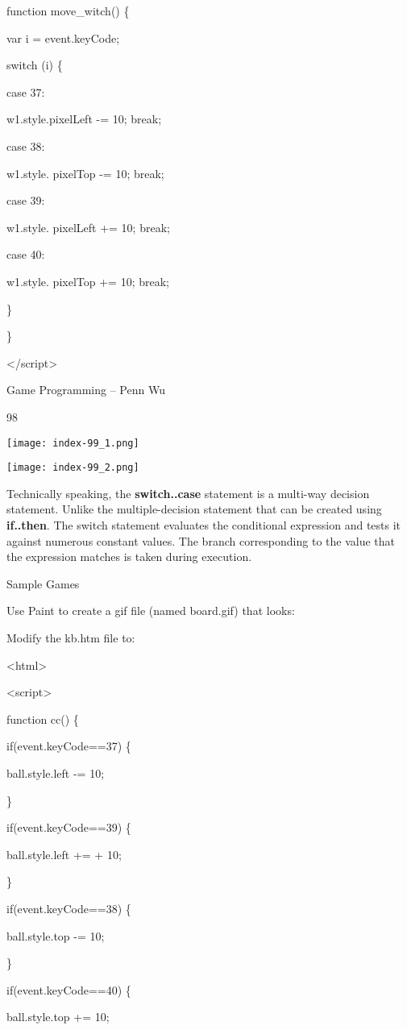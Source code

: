 \documentclass[
]{article}
\begin{document}
function move\_witch() \{

var i = event.keyCode;

switch (i) \{

case 37:

w1.style.pixelLeft -= 10; break;

case 38:

w1.style. pixelTop -= 10; break;

case 39:

w1.style. pixelLeft += 10; break;

case 40:

w1.style. pixelTop += 10; break;

\}

\}

\textless/script\textgreater{}

Game Programming -- Penn Wu

98

\protect\hypertarget{index_split_007.htmlux5cux23p99}{}{}\texttt{[image: index-99\_1.png]}

\texttt{[image: index-99\_2.png]}

Technically speaking, the \textbf{switch..case} statement is a multi-way
decision statement. Unlike the multiple-decision statement that can be
created using \textbf{if..then}. The switch statement evaluates the
conditional expression and tests it against numerous constant values.
The branch corresponding to the value that the expression matches is
taken during execution.

Sample Games

Use Paint to create a gif file (named board.gif) that looks:

Modify the kb.htm file to:

\textless html\textgreater{}

\textless script\textgreater{}

function cc() \{

if(event.keyCode==37) \{

ball.style.left -= 10;

\}

if(event.keyCode==39) \{

ball.style.left += + 10;

\}

if(event.keyCode==38) \{

ball.style.top -= 10;

\}

if(event.keyCode==40) \{

ball.style.top += 10;
\end{document}
